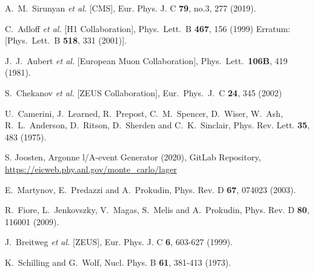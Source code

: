 \documentclass[prd,amsmath,%
twocolumn,floatfix,amssymb, preprintnumbers, linenumbers,nofootinbib, superscriptaddress]{revtex4}
\begin{document}
\begin{thebibliography}{99}
A.~M.~Sirunyan {\it et al.} [CMS],
Eur. Phys. J. C \textbf{79}, no.3, 277 (2019). 


  C.~Adloff {\it et al.} [H1 Collaboration],
  Phys.\ Lett.\ B {\bf 467}, 156 (1999)
  Erratum: [Phys.\ Lett.\ B {\bf 518}, 331 (2001)].
 

  J.~J.~Aubert {\it et al.} [European Muon Collaboration],
  Phys.\ Lett.\  {\bf 106B}, 419 (1981).
 


  S.~Chekanov {\it et al.} [ZEUS Collaboration],
  Eur.\ Phys.\ J.\ C \textbf{24}, 345 (2002)


U.~Camerini, J.~Learned, R.~Prepost, C.~M.~Spencer, D.~Wiser, W.~Ash, R.~L.~Anderson, D.~Ritson, D.~Sherden and C.~K.~Sinclair,
Phys. Rev. Lett. \textbf{35}, 483 (1975).



S. Joosten, Argonne l/A-event Generator (2020), GitLab Repository,
\url{https://eicweb.phy.anl.gov/monte_carlo/lager}


E.~Martynov, E.~Predazzi and A.~Prokudin,
Phys. Rev. D \textbf{67}, 074023 (2003).

R.~Fiore, L.~Jenkovszky, V.~Magas, S.~Melis and A.~Prokudin,
Phys. Rev. D \textbf{80}, 116001 (2009). 

J.~Breitweg \textit{et al.} [ZEUS],
Eur. Phys. J. C \textbf{6}, 603-627 (1999). 


K.~Schilling and G.~Wolf,
Nucl. Phys. B \textbf{61}, 381-413 (1973).


\end{thebibliography}
\end{document}
